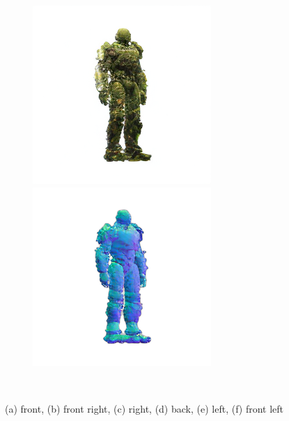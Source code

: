 \begin{figure}[ht]
\begin{subfigure}[b]{0.22\textwidth}
        \caption{}
    \end{subfigure}
    \begin{subfigure}[b]{0.22\textwidth}
        \centering
        \includegraphics[width=\textwidth]{etc/a robot made out of plants/wonder3D/rgb_000_front_left.png}
        \includegraphics[width=\textwidth]{etc/a robot made out of plants/wonder3D/normals_000_front_left.png}
        \caption{}
    \end{subfigure}
    \caption{(a) front, (b) front right, (c) right, (d) back, (e) left, (f) front left}~\label{fig:generationWonder3D}
\end{figure}

